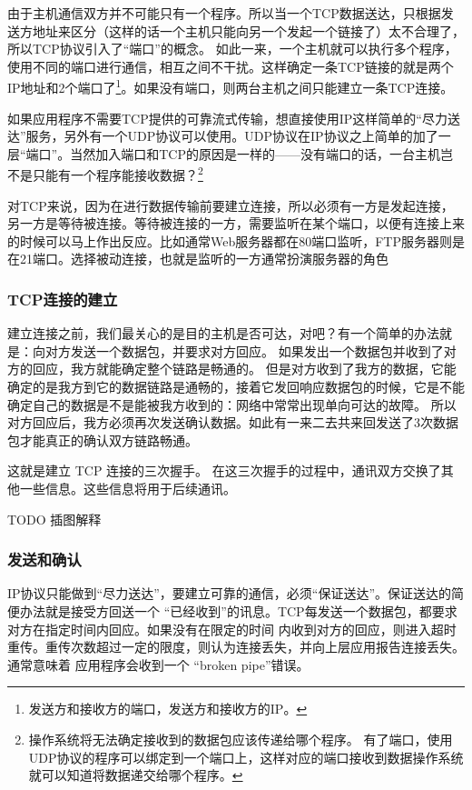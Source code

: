 由于主机通信双方并不可能只有一个程序。所以当一个TCP数据送达，只根据发送方地址来区分（这样的话一个主机只能向另一个发起一个链接了）太不合理了，所以TCP协议引入了“端口”的概念。
如此一来，一个主机就可以执行多个程序，使用不同的端口进行通信，相互之间不干扰。这样确定一条TCP链接的就是两个IP地址和2个端口了\footnote{发送方和接收方的端口，发送方和接收方的IP。}。如果没有端口，则两台主机之间只能建立一条TCP连接。

如果应用程序不需要TCP提供的可靠流式传输，想直接使用IP这样简单的“尽力送达”服务，另外有一个UDP协议可以使用。UDP协议在IP协议之上简单的加了一层“端口”。当然加入端口和TCP的原因是一样的——没有端口的话，一台主机岂不是只能有一个程序能接收数据？\footnote{操作系统将无法确定接收到的数据包应该传递给哪个程序。
有了端口，使用UDP协议的程序可以绑定到一个端口上，这样对应的端口接收到数据操作系统就可以知道将数据递交给哪个程序。}

对TCP来说，因为在进行数据传输前要建立连接，所以必须有一方是发起连接，另一方是等待被连接。等待被连接的一方，需要监听在某个端口，以便有连接上来的时候可以马上作出反应。比如通常Web服务器都在80端口监听，FTP服务器则是在21端口。选择被动连接，也就是监听的一方通常扮演服务器的角色

\subsubsection{TCP连接的建立}

建立连接之前，我们最关心的是目的主机是否可达，对吧？有一个简单的办法就是：向对方发送一个数据包，并要求对方回应。
如果发出一个数据包并收到了对方的回应，我方就能确定整个链路是畅通的。
但是对方收到了我方的数据，它能确定的是我方到它的数据链路是通畅的，接着它发回响应数据包的时候，它是不能确定自己的数据是不是能被我方收到的：网络中常常出现单向可达的故障。
所以对方回应后，我方必须再次发送确认数据。如此有一来二去共来回发送了3次数据包才能真正的确认双方链路畅通。

这就是建立 TCP 连接的三次握手。
在这三次握手的过程中，通讯双方交换了其他一些信息。这些信息将用于后续通讯。


TODO 插图解释 %


\subsubsection{发送和确认}
IP协议只能做到“尽力送达”，要建立可靠的通信，必须“保证送达”。保证送达的简便办法就是接受方回送一个
“已经收到”的讯息。TCP每发送一个数据包，都要求对方在指定时间内回应。如果没有在限定的时间
内收到对方的回应，则进入超时重传。重传次数超过一定的限度，则认为连接丢失，并向上层应用报告连接丢失。通常意味着
应用程序会收到一个 “broken pipe”错误。

